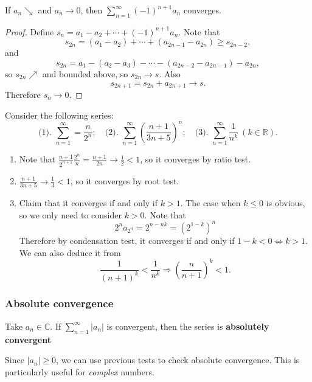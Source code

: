 \begin{theorem}\label{thm:Alternating series test}
    If $a_n\searrow$ and $a_n \to 0 $, then $ \sum_{n=1}^{\infty}(-1)^{n+1}a_n $ converges.
\end{theorem}
\begin{proof}
    Define $ s_n = a_1-a_2+\cdots+(-1)^{n+1}a_n $. Note that 
    \[
        s_{2n} = (a_1-a_2)+\cdots+(a_{2n-1}-a_{2n})\ge s_{2n-2},
    \]
    and 
    \[
        s_{2n} = a_1 - (a_2-a_3)-\cdots-(a_{2n-2}-a_{2n-1}) - a_{2n},
    \]
    so $ s_{2n} \nearrow $ and bounded above, so $ s_{2n}\to s $. Also
    \[
        s_{2n+1}=s_{2n}+a_{2n+1}\to s.
    \]
    Therefore $ s_n\to 0 $.
\end{proof}

\begin{example}
    Consider the following series: 
    \[ 
        \text{(1). } \sum_{n=1}^{\infty} = \frac{n}{2^n};\quad \text{(2). } \sum_{n=1}^{\infty}\left( \frac{n+1}{3n+5} \right)^{n}; \quad \text{(3). } \sum_{n=1}^{\infty}\frac{1}{n^k}\ (k\in \mathbb{R}).
    \]

    \begin{enumerate}[(1).]
        \item Note that $ \frac{n+1}{2^{n+1}}\frac{2^n}{n}=\frac{n+1}{2n}\to \frac{1}{2}<1 $, so it converges by ratio test.
        \item $ \frac{n+1}{3n+5}\to \frac{1}{3}<1 $, so it converges by root test.
        \item Claim that it converges if and only if $k>1$. The case when $ k\le 0 $ is obvious, so we only need to consider $k>0$. Note that 
        \[
            2^na_{2^n} = 2^{n-nk}=(2^{1-k})^n
        \]
        Therefore by condensation test, it converges if and only if $ 1-k<0 \Leftrightarrow k>1 $. We can also deduce it from 
        \[
            \frac{1}{(n+1)^k}<\frac{1}{n^k} \Longrightarrow \left( \frac{n}{n+1} \right)^k<1.
        \]
    \end{enumerate}
\end{example}

\subsubsection{Absolute convergence}
\begin{definition}
    Take $ a_n\in \mathbb{C}  $. If $ \sum_{n=1}^{\infty}|a_n| $ is convergent, then the series is \textbf{absolutely convergent}
\end{definition}
\begin{note}
    Since $ |a_n|\ge 0 $, we can use previous tests to check absolute convergence. This is particularly useful for \textit{complex} numbers.
\end{note}

